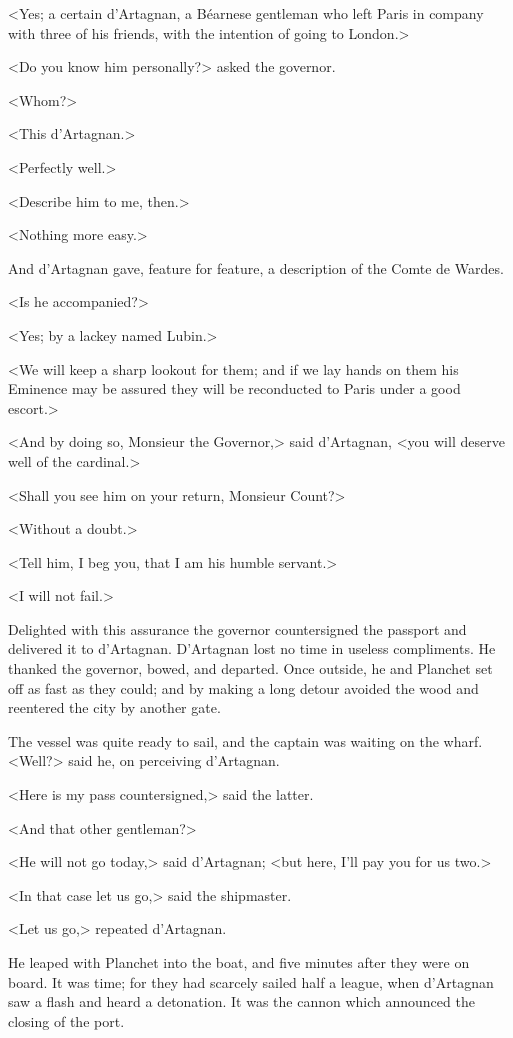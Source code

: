 <Yes; a certain d'Artagnan, a Béarnese gentleman who left Paris in company with three of his friends, with the intention of going to London.> 

<Do you know him personally?> asked the governor. 

<Whom?> 

<This d'Artagnan.> 

<Perfectly well.> 

<Describe him to me, then.> 

<Nothing more easy.> 

And d'Artagnan gave, feature for feature, a description of the Comte de Wardes. 

<Is he accompanied?> 

<Yes; by a lackey named Lubin.> 

<We will keep a sharp lookout for them; and if we lay hands on them his Eminence may be assured they will be reconducted to Paris under a good escort.> 

<And by doing so, Monsieur the Governor,> said d'Artagnan, <you will deserve well of the cardinal.> 

<Shall you see him on your return, Monsieur Count?> 

<Without a doubt.> 

<Tell him, I beg you, that I am his humble servant.> 

<I will not fail.> 

Delighted with this assurance the governor countersigned the passport and delivered it to d'Artagnan. D'Artagnan lost no time in useless compliments. He thanked the governor, bowed, and departed. Once outside, he and Planchet set off as fast as they could; and by making a long detour avoided the wood and reentered the city by another gate. 

The vessel was quite ready to sail, and the captain was waiting on the wharf. <Well?> said he, on perceiving d'Artagnan. 

<Here is my pass countersigned,> said the latter. 

<And that other gentleman?>

<He will not go today,> said d'Artagnan; <but here, I'll pay you for us two.> 

<In that case let us go,> said the shipmaster. 

<Let us go,> repeated d'Artagnan. 

He leaped with Planchet into the boat, and five minutes after they were on board. It was time; for they had scarcely sailed half a league, when d'Artagnan saw a flash and heard a detonation. It was the cannon which announced the closing of the port. 

